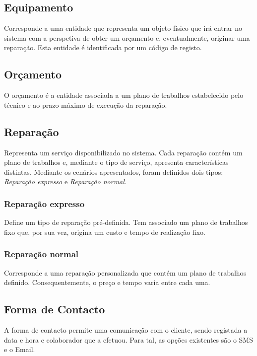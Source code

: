 \documentclass[a4paper,12pt]{scrreprt}
\begin{document}
\subsection{Equipamento} \label{ent_equipamento}
Corresponde a uma entidade que representa um objeto físico que irá entrar no sistema com a perspetiva de obter um orçamento e,
 eventualmente, originar uma reparação.
Esta entidade é identificada por um código de registo.

\subsection{Orçamento} \label{ent_orcamento}
O orçamento é a entidade associada a um plano de trabalhos estabelecido pelo técnico e ao prazo máximo de execução da reparação.

\subsection{Reparação} \label{ent_reparacao}
Representa um serviço disponibilizado no sistema. Cada reparação contém um plano de trabalhos e,
mediante o tipo de serviço, apresenta características distintas.
Mediante os cenários apresentados, foram definidos dois tipos: \textit{Reparação expresso} e \textit{Reparação normal}.

\subsubsection{Reparação expresso} \label{ent_reparacao-expresso}
Define um tipo de reparação pré-definida.
Tem associado um plano de trabalhos fixo que, por sua vez, origina um custo e tempo de realização fixo.

\subsubsection{Reparação normal} \label{ent_reparacao-normal}
Corresponde a uma reparação personalizada que contém um plano de trabalhos definido.
Consequentemente, o preço e tempo varia entre cada uma.

\subsection{Forma de Contacto} \label{ent_formas-contacto}
A forma de contacto permite uma comunicação com o cliente, sendo registada a data e hora e colaborador que a efetuou.
Para tal, as opções existentes são o SMS e o Email.
\end{document}

